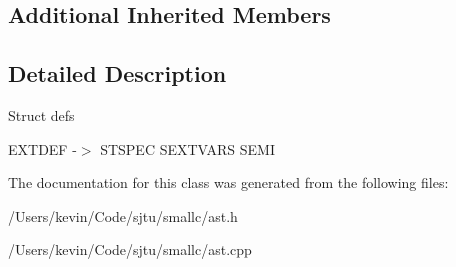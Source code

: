 \subsection*{Additional Inherited Members}


\subsection{Detailed Description}
Struct defs

E\+X\+T\+D\+EF -\/$>$ S\+T\+S\+P\+EC S\+E\+X\+T\+V\+A\+RS S\+E\+MI 

The documentation for this class was generated from the following files\+:\begin{DoxyCompactItemize}
\item 
/\+Users/kevin/\+Code/sjtu/smallc/ast.\+h\item 
/\+Users/kevin/\+Code/sjtu/smallc/ast.\+cpp\end{DoxyCompactItemize}
